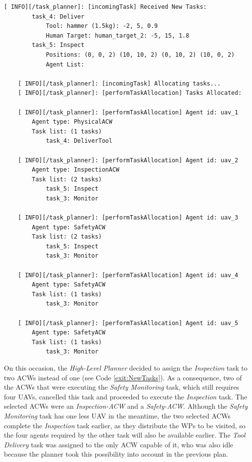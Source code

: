 \begin{lstlisting}[caption={Feedback messages printed after the arrival of new tasks}, breaklines=true, label=exit:NewTasks]
    [ INFO][/task_planner]: [incomingTask] Received New Tasks:
        task_4: Deliver
            Tool: hammer (1.5kg): -2, 5, 0.9
            Human Target: human_target_2: -5, 15, 1.8
        task_5: Inspect
            Positions: (0, 0, 2) (10, 10, 2) (0, 10, 2) (10, 0, 2)
            Agent List:

    [ INFO][/task_planner]: [incomingTask] Allocating tasks...
    [ INFO][/task_planner]: [performTaskAllocation] Tasks Allocated:

    [ INFO][/task_planner]: [performTaskAllocation] Agent id: uav_1
        Agent type: PhysicalACW
        Task list: (1 tasks)
            task_4: DeliverTool

    [ INFO][/task_planner]: [performTaskAllocation] Agent id: uav_2
        Agent type: InspectionACW
        Task list: (2 tasks)
            task_5: Inspect
            task_3: Monitor

    [ INFO][/task_planner]: [performTaskAllocation] Agent id: uav_3
        Agent type: SafetyACW
        Task list: (2 tasks)
            task_5: Inspect
            task_3: Monitor

    [ INFO][/task_planner]: [performTaskAllocation] Agent id: uav_4
        Agent type: SafetyACW
        Task list: (1 tasks)
            task_3: Monitor

    [ INFO][/task_planner]: [performTaskAllocation] Agent id: uav_5
        Agent type: SafetyACW
        Task list: (1 tasks)
            task_3: Monitor
\end{lstlisting}

On this occasion, the \emph{High-Level Planner} decided to assign the \emph{Inspection} task to two \glspl{ACW} instead of one (see Code \ref{exit:NewTasks}). As a consequence, two of the \glspl{ACW} that were executing the \emph{Safety Monitoring} task, which still requires four \glspl{UAV}, cancelled this task and proceeded to execute the \emph{Inspection} task. The selected \glspl{ACW} were an \emph{Inspection-ACW} and a \emph{Safety-ACW}. Although the \emph{Safety Monitoring} task has one less \gls{UAV} in the meantime, the two selected \glspl{ACW} complete the \emph{Inspection} task earlier, as they distribute the \glspl{WP} to be visited, so the four agents required by the other task will also be available earlier. The \emph{Tool Delivery} task was assigned to the only \gls{ACW} capable of it, who was also idle because the planner took this possibility into account in the previous plan.

